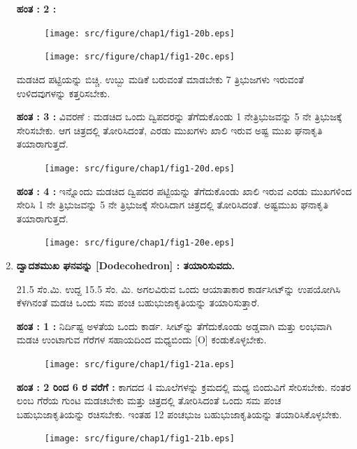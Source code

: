 \begin{enumerate}
\noindent
\textbf{ಹಂತ : 2 :}
\begin{figure}[H]
\centering
\texttt{[image: src/figure/chap1/fig1-20b.eps]}
\end{figure}
\begin{figure}[H]
\centering
\texttt{[image: src/figure/chap1/fig1-20c.eps]}
\end{figure}

ಮಡಚಿದ ಪಟ್ಟಿಯನ್ನು ಬಿಚ್ಚಿ. ಉಬ್ಬು ಮಡಿಕೆ ಬರುವಂತೆ ಮಾಡಬೇಕು 7 ತ್ರಿಭುಜಗಳು ಇರುವಂತೆ ಉಳಿದವುಗಳನ್ನು ಕತ್ತರಿಸಬೇಕು. 


\noindent
\textbf{ಹಂತ : 3 :} ವಿವರಣೆ : ಮಡಚಿದ ಒಂದು ದ್ವಿಪದರನ್ನು ತೆಗೆದುಕೊಂಡು 1 ನೇ\break  ತ್ರಿಭುಜವನ್ನು  5 ನೇ ತ್ರಿಭುಜಕ್ಕೆ  ಸೇರಿಸಬೇಕು. ಆಗ ಚಿತ್ರದಲ್ಲಿ ತೋರಿಸಿದಂತೆ, ಎರಡು ಮುಖಗಳು ಖಾಲಿ ಇರುವ ಅಷ್ಟ ಮುಖ ಘನಾಕೃತಿ ತಯಾರಾಗುತ್ತದೆ. 
\begin{figure}[H]
\centering
\texttt{[image: src/figure/chap1/fig1-20d.eps]}
\end{figure}

 
 \noindent
\textbf{ಹಂತ : 4 :} ಇನ್ನೊಂದು ಮಡಚಿದ ದ್ವಿಪದರ ಪಟ್ಟಿಯನ್ನು ತೆಗೆದುಕೊಂಡು ಖಾಲಿ ಇರುವ ಎರಡು ಮುಖಗಳಿಂದ ಸೇರಿಸಿ  1 ನೇ ತ್ರಿಭುಜವನ್ನು 5  ನೇ ತ್ರಿಭುಜಕ್ಕೆ  ಸೇರಿಸಿದಾಗ  ಚಿತ್ರದಲ್ಲಿ ತೋರಿಸಿದಂತೆ. ಅಷ್ಟಮುಖ ಘನಾಕೃತಿ ತಯಾರಾಗುತ್ತದೆ. 
\begin{figure}[H]
\centering
\texttt{[image: src/figure/chap1/fig1-20e.eps]}\\
\end{figure}

\item \textbf{ದ್ವಾದಶಮುಖ ಘನವನ್ನು [Dodecohedron] : ತಯಾರಿಸುವದು.}
 
 21.5 ಸೆಂ.ಮಿ. ಉದ್ದ 15.5 ಸೆಂ. ಮಿ. ಅಗಲವಿರುವ ಒಂದು ಆಯಾತಾಕಾರ ಕಾರ್ಡಸೀಟ್‌ನ್ನು ಉಪಯೋಗಿಸಿ ಕೆಳಗಿನಂತೆ ಮಡಚಿ ಒಂದು ಸಮ ಪಂಚ ಬಹು\break ಭುಜಾಕೃತಿಯನ್ನು ತಯಾರಿಸುತ್ತಾರೆ. 
 
 \noindent
 {\bf ಹಂತ : 1 :} ನಿರ್ದಿಷ್ಟ ಅಳತೆಯ ಒಂದು ಕಾರ್ಡ. ಸೀಟ್‌ನ್ನು ತೆಗೆದುಕೊಂಡು ಅಡ್ಡ\break ವಾಗಿ ಮತ್ತು ಲಂಭವಾಗಿ ಮಡಚಿ ಉಂಟಾಗುವ ಗೆರೆಗಳ ಸಹಾಯದಿಂದ ಮಧ್ಯ\break ಬಿಂದು  [O] ಕಂಡುಕೊಳ್ಳಬೇಕು. 
 \begin{figure}[H]
\centering
\texttt{[image: src/figure/chap1/fig1-21a.eps]}
\end{figure}

 \noindent
 {\bf ಹಂತ : 2 ರಿಂದ 6 ರ ವರೆಗೆ :} ಕಾಗದದ 4 ಮೂಲೆಗಳನ್ನು ಕ್ರಮದಲ್ಲಿ ಮಧ್ಯ ಬಿಂದುವಿಗೆ ಸೇರಿಸಬೇಕು. ನಂತರ ಲಂಬ ಗೆರೆಯ ಗುಂಟ ಮಡಚಬೇಕು ಮತ್ತು ಚಿತ್ರದಲ್ಲಿ ತೋರಿಸಿದಂತೆ ಒಂದು ಸಮ ಪಂಚ ಬಹುಭುಜಾಕೃತಿಯನ್ನು ರಚಿಸಬೇಕು. ಇಂತಹ  12 ಪಂಚಭುಜ ಬಹುಭುಜಾಕೃತಿಯನ್ನು ತಯಾರಿಸಿಕೊಳ್ಳಬೇಕು. 
  \begin{figure}[H]
\centering
\texttt{[image: src/figure/chap1/fig1-21b.eps]}
\end{figure}


\end{enumerate}
